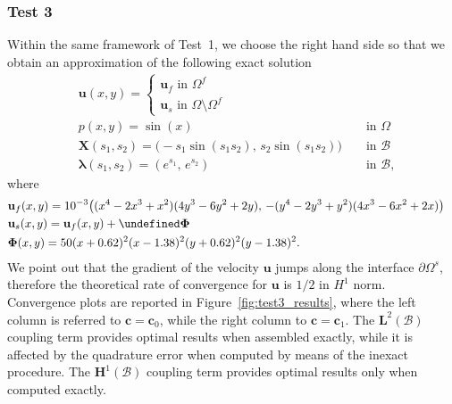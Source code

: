 \documentclass[oneside]{amsart} %
\let\curl\undefined\DeclareMathOperator{\curl}{curl} %
\newcommand\Hub{\mathbf{H}^1(\B)} %
\newcommand\LdBd{\mathbf{L}^2(\B)} %
\newcommand\Of{\Omega^f} %
\newcommand\Os{\Omega^s} %
\newcommand\B{\mathcal B} %
\renewcommand\u{\mathbf{u}} %
\renewcommand\c{\mathbf{c}} %
\newcommand\X{\mathbf{X}} %
\newcommand\llambda{\boldsymbol\lambda} %
\begin{document}
	\subsubsection*{Test 3}
	Within the same framework of Test~1, we choose the right hand side so that we obtain an approximation of the following exact solution
	\begin{equation*}
		\begin{aligned}
			&\u(x,y) = \begin{cases*}
				\u_f \text{ in }\Of\\
				\u_s \text{ in }\Omega\setminus\Of
			\end{cases*}\\
			&p(x,y) = \sin(x)&&\text{ in }\Omega\\
			&\X(s_1,s_2) = \big(-s_1\sin(s_1s_2),\,s_2\sin(s_1s_2)\big)&&\text{ in }\B\\
			&\llambda(s_1,s_2) = \left( e^{s_1},\,e^{s_2}\right)&&\text{ in }\B,
		\end{aligned}
	\end{equation*}
	where 
	\begin{equation*}
		\begin{aligned}
			&\u_f(x,y) = 10^{-3}\big((x^4 - 2x^3 + x^2)(4y^3 - 6y^2 + 2y),\,-(y^4 - 2y^3 + y^2)(4x^3 - 6x^2 + 2x)\big)&&\\
			&\u_s(x,y) = \u_f(x,y) + \curl\boldsymbol{\Phi}&&\\
			&\boldsymbol{\Phi}(x,y) = 50 (x+0.62)^2 (x-1.38)^2 (y+0.62)^2 (y-1.38)^2.
		\end{aligned}
	\end{equation*}
	We point out that the gradient of the velocity $\u$ jumps along the interface $\partial\Os$, therefore the theoretical rate of convergence for $\u$ is $1/2$ in $H^1$ norm. Convergence plots are reported in Figure~\ref{fig:test3_results}, where the left column is referred to $\c=\c_0$, while the right column to $\c=\c_1$. The $\LdBd$ coupling term provides optimal results when assembled exactly, while it is affected by the quadrature error when computed by means of the inexact procedure. The $\Hub$ coupling term provides optimal results only when computed exactly.
	
\end{document}

